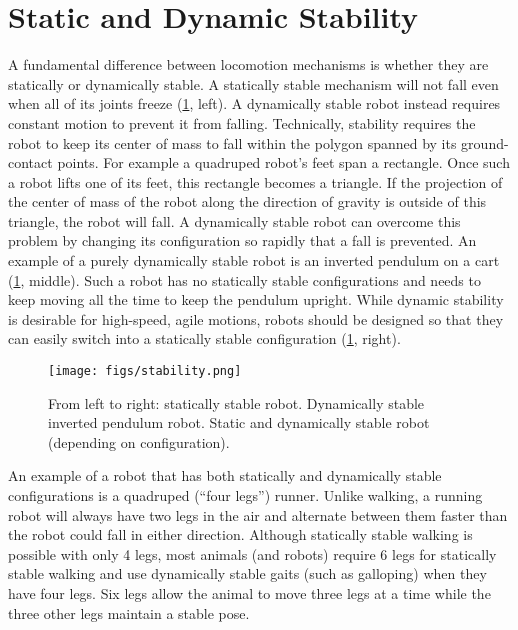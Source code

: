 \section{Static and Dynamic Stability}\label{sec:stability}
A fundamental difference between locomotion mechanisms is whether they are statically or dynamically stable. A statically stable mechanism will not fall even when all of its joints freeze (\cref{fig:stability}, left). A dynamically stable robot instead requires constant motion to prevent it from falling. Technically, stability requires the robot to keep its center of mass to fall within the polygon spanned by its ground-contact points. For example a quadruped robot's feet span a rectangle. Once such a robot lifts one of its feet, this rectangle becomes a triangle. If the projection of the center of mass of the robot along the direction of gravity is outside of this triangle, the robot will fall. A dynamically stable robot can overcome this problem by changing its configuration so rapidly that a fall is prevented. An example of a purely dynamically stable robot is an inverted pendulum on a cart  (\cref{fig:stability}, middle). Such a robot has no statically stable configurations and needs to keep moving all the time to keep the pendulum upright. While dynamic stability is desirable for high-speed, agile motions, robots should be designed so that they can easily switch into a statically stable configuration (\cref{fig:stability}, right).

\begin{figure}
	\centering
		\texttt{[image: figs/stability.png]}
	\caption{From left to right: statically stable robot. Dynamically stable inverted pendulum robot. Static and dynamically stable robot (depending on configuration).}
	\label{fig:stability}
\end{figure}

An example of a robot that has both statically and dynamically stable configurations is a quadruped (``four legs'') runner. Unlike walking, a running robot will always have two legs in the air and alternate between them faster than the robot could fall in either direction. Although statically stable walking is possible with only 4 legs, most animals (and robots) require 6 legs for statically stable walking and use dynamically stable gaits (such as galloping) when they have four legs. Six legs allow the animal to move three legs at a time while the three other legs maintain a stable pose.



